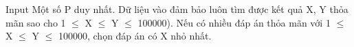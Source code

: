 Input
Một số P duy nhất. Dữ liệu vào đảm bảo luôn tìm được kết quả X, Y thỏa mãn sao cho 1  $\le$  X  $\le$  Y  $\le$  100000). Nếu có nhiều đáp án thỏa mãn với 1  $\le$  X  $\le$  Y  $\le$  100000, chọn đáp án có X nhỏ nhất.